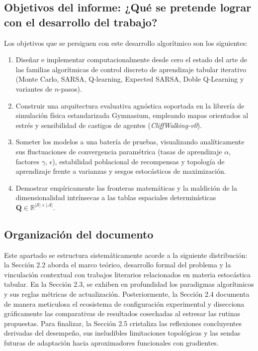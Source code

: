 \subsection{Objetivos del informe: ¿Qué se pretende lograr con el desarrollo del trabajo?}
Los objetivos que se persiguen con este desarrollo algorítmico son los siguientes:
\begin{enumerate}
    \item Diseñar e implementar computacionalmente desde cero el estado del arte de las familias algorítmicas de control discreto de aprendizaje tabular iterativo (Monte Carlo, SARSA, Q-learning, Expected SARSA, Doble Q-Learning y variantes de $n$-pasos).
    \item Construir una arquitectura evaluativa agnóstica soportada en la librería de simulación física estandarizada Gymnasium, empleando mapas orientados al estrés y sensibilidad de castigos de agentes (\textit{CliffWalking-v0}).
    \item Someter los modelos a una batería de pruebas, visualizando analíticamente sus fluctuaciones de convergencia paramétrica (tasas de aprendizaje $\alpha$, factores $\gamma$, $\epsilon$), estabilidad poblacional de recompensas y topología de aprendizaje frente a varianzas y sesgos estocásticos de maximización.
    \item Demostrar empíricamente las fronteras matemáticas y la maldición de la dimensionalidad intrínsecas a las tablas espaciales determinísticas $\mathbf{Q} \in \mathbb{R}^{|\mathcal{S}| \times |\mathcal{A}|}$.
\end{enumerate}

\subsection{Organización del documento}
Este apartado se estructura sistemáticamente acorde a la siguiente distribución: la Sección 2.2 aborda el marco teórico, desarrollo formal del problema y la vinculación contextual con trabajos literarios relacionados en materia estocástica tabular. En la Sección 2.3, se exhiben en profundidad los paradigmas algorítmicos y sus reglas métricas de actualización. Posteriormente, la Sección 2.4 documenta de manera meticulosa el ecosistema de configuración experimental y disecciona gráficamente las comparativas de resultados cosechadas al estresar las rutinas propuestas. Para finalizar, la Sección 2.5 cristaliza las reflexiones concluyentes derivadas del desempeño, sus ineludibles limitaciones topológicas y las sendas futuras de adaptación hacia aproximadores funcionales con gradientes.

